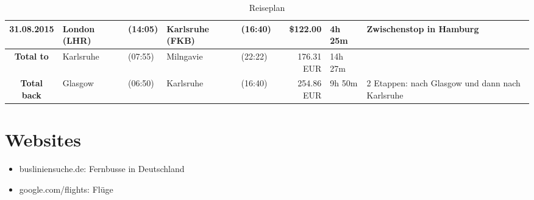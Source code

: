 \documentclass[a4paper, landscape]{scrartcl}
\begin{document}
\begin{table}[ht]
\begin{tabular}{cl p{2cm} l p{2cm} rl p{5cm}}
    31.08.2015 & London (LHR)             & (14:05)          & Karlsruhe (FKB)          & (16:40)        & \$122.00       & 4h 25m & Zwischenstop in Hamburg             \\\midrule
    \textbf{Total to}   & Karlsruhe       & (07:55)          & Milngavie                & (22:22)        &   176.31 EUR   &14h 27m & \\
    \textbf{Total back} & Glasgow         & (06:50)          & Karlsruhe                & (16:40)        &   254.86 EUR   & 9h 50m & 2 Etappen: nach Glasgow und dann nach Karlsruhe\\
        \bottomrule
        \end{tabular}
        \caption{Reiseplan}
        \label{table:reiseplan}
    \end{table}
\vfill %

\section*{Websites}

\begin{itemize}
    \item busliniensuche.de: Fernbusse in Deutschland
    \item google.com/flights: Flüge
\end{itemize}
\end{document}
